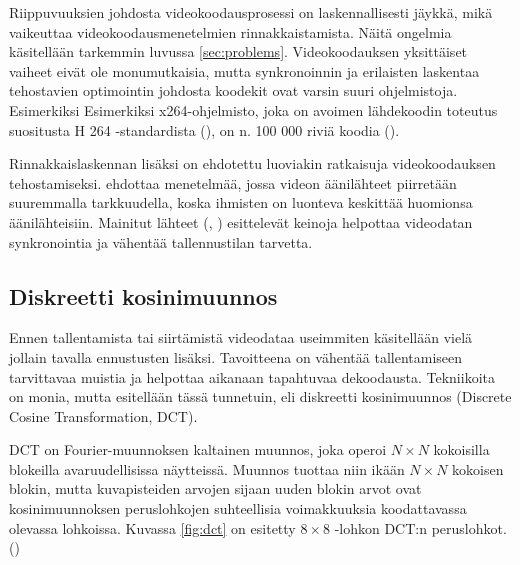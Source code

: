 Riippuvuuksien johdosta videokoodausprosessi on laskennallisesti jäykkä, mikä
vaikeuttaa videokoodausmenetelmien rinnakkaistamista. Näitä ongelmia
käsitellään tarkemmin luvussa \ref{sec:problems}. Videokoodauksen yksittäiset
vaiheet eivät ole monumutkaisia, mutta synkronoinnin ja erilaisten laskentaa
tehostavien optimointin johdosta koodekit ovat varsin suuri ohjelmistoja. Esimerkiksi
Esimerkiksi x264-ohjelmisto, joka on avoimen lähdekoodin toteutus
suositusta H 264 -standardista (\citealt{h264}), on n. 100 000 riviä koodia (\citealt{x264}).

Rinnakkaislaskennan lisäksi on ehdotettu luoviakin ratkaisuja videokoodauksen
tehostamiseksi. \citealt{lee} ehdottaa menetelmää, jossa videon
äänilähteet piirretään suuremmalla tarkkuudella, koska ihmisten on luonteva
keskittää huomionsa äänilähteisiin. Mainitut lähteet (\citealt{mujal},
\citealt{sync}) esittelevät keinoja helpottaa videodatan synkronointia ja vähentää
tallennustilan tarvetta.

\subsection{Diskreetti kosinimuunnos}

Ennen tallentamista tai siirtämistä videodataa useimmiten käsitellään vielä
jollain tavalla ennustusten lisäksi. Tavoitteena on vähentää tallentamiseen
tarvittavaa muistia ja helpottaa aikanaan tapahtuvaa dekoodausta. Tekniikoita
on monia, mutta esitellään tässä tunnetuin, eli diskreetti kosinimuunnos
(Discrete Cosine Transformation, DCT). 

DCT on Fourier-muunnoksen kaltainen muunnos, joka operoi $N \times N$
kokoisilla blokeilla avaruudellisissa näytteissä. Muunnos tuottaa niin
ikään $N \times N$ kokoisen blokin, mutta kuvapisteiden arvojen sijaan
uuden blokin arvot ovat kosinimuunnoksen peruslohkojen suhteellisia
voimakkuuksia koodattavassa olevassa lohkoissa. Kuvassa \ref{fig:dct} on esitetty
$8  \times 8$ -lohkon DCT:n peruslohkot. (\citealt{h264})


